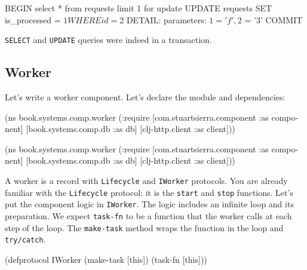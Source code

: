 \begin{english}
  \begin{sql}
BEGIN
select * from requests limit 1 for update
UPDATE requests SET is_processed = $1 WHERE id = $2
DETAIL:  parameters: $1 = 'f', $2 = '3'
COMMIT
  \end{sql}
\end{english}

\fi

\noindent
\verb|SELECT| and \verb|UPDATE| queries were indeed in a transaction.

\subsection{Worker}

Let's write a worker component. Let's declare the module and dependencies:

\ifnarrow

\begin{english}
  \begin{clojure}
(ns book.systems.comp.worker
  (:require
   [com.stuartsierra.component
    :as component]
   [book.systems.comp.db :as db]
   [clj-http.client :as client]))
  \end{clojure}
\end{english}

\else

\begin{english}
  \begin{clojure}
(ns book.systems.comp.worker
  (:require
   [com.stuartsierra.component :as component]
   [book.systems.comp.db :as db]
   [clj-http.client :as client]))
  \end{clojure}
\end{english}

\fi



A worker is a record with \verb|Lifecycle| and \verb|IWorker| protocols. You are already familiar with the \verb|Lifecycle| protocol: it is the \verb|start| and \verb|stop| functions. Let's put the component logic in \verb|IWorker|. The logic includes an infinite loop and its preparation. We expect \verb|task-fn| to be a function that the worker calls at each step of the loop. The \verb|make-task| method wraps the function in the loop and \verb|try/catch|.

\begin{english}
  \begin{clojure}
(defprotocol IWorker
  (make-task [this])
  (task-fn [this]))
  \end{clojure}
\end{english}

